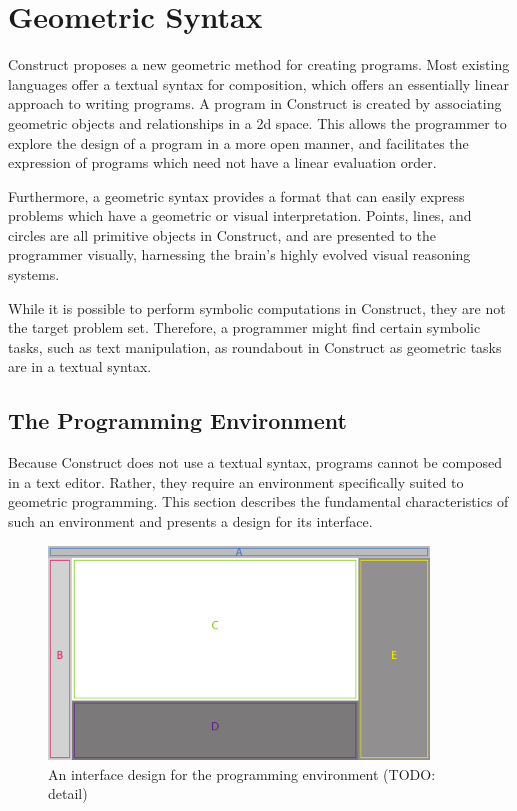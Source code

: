 \documentclass[twoside,openright,11pt]{report}
\begin{document}
\chapter{Geometric Syntax}
\label{chap:syntax}

Construct proposes a new geometric method for creating programs. 
Most existing languages offer a textual syntax for composition, which offers an essentially linear approach to writing programs. 
A program in Construct is created by associating geometric objects and relationships in a 2d space. 
This allows the programmer to explore the design of a program in a more open manner, and facilitates the expression of programs which need not have a linear evaluation order. 

Furthermore, a geometric syntax provides a format that can easily express problems which have a geometric or visual interpretation. 
Points, lines, and circles are all primitive objects in Construct, and are presented to the programmer visually, harnessing the brain's highly evolved visual reasoning systems. 

While it is possible to perform symbolic computations in Construct, they are not the target problem set. 
Therefore, a programmer might find certain symbolic tasks, such as text manipulation, as roundabout in Construct as geometric tasks are in a textual syntax.

\section{The Programming Environment}
\label{sec:environ}

Because Construct does not use a textual syntax, programs cannot be composed in a text editor. 
Rather, they require an environment specifically suited to geometric programming. 
This section describes the fundamental characteristics of such an environment and presents a design for its interface.

\begin{figure}[h]
  \centering
  \includegraphics[width=0.9\textwidth]{interface.pdf}
  \caption{An interface design for the programming environment (TODO: detail)}
  \label{fig:interface}
\end{figure}
\end{document}
